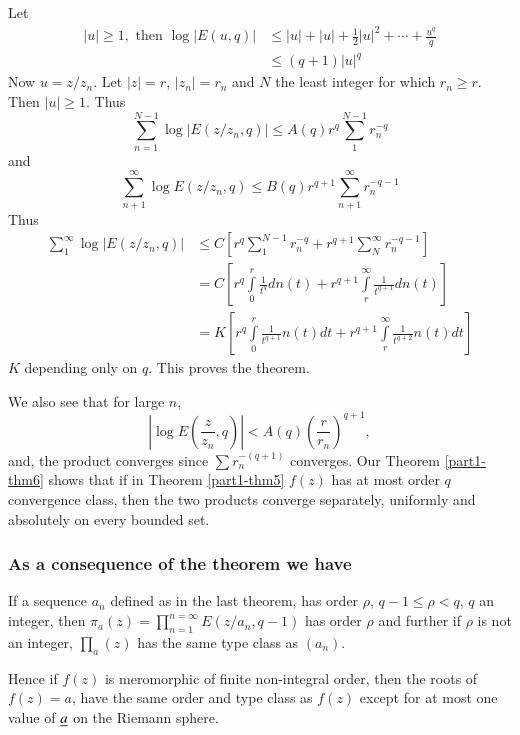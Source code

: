 Let
\begin{align*}
|u|\geq 1, \text{ \ then \ } \log |E(u,q)| &\leq
|u|+|u|+\frac{1}{2}|u|^{2}+\cdots+\frac{u^{q}}{q}\\
&\leq (q+1)|u|^{q} 
\end{align*}
Now $u=z/z_{n}$. Let $|z|=r$, $|z_{n}|=r_{n}$ and $N$ the least
integer for which $r_{n}\geq r$. Then $|u|\geq 1$. Thus
$$
\sum^{N-1}_{n=1}\log |E(z/z_{n},q)|\leq
A(q)r^{q}\sum^{N-1}_{1}r^{-q}_{n}
$$
and
$$
\sum^{\infty}_{n+1}\log E(z/z_{n},q)\leq
B(q)r^{q+1}\sum^{\infty}_{n+1}r^{-q-1}_{n} 
$$
Thus 
\begin{align*}
\sum^{\infty}_{1}\log |E(z/z_{n},q)| &\leq
C\left[r^{q}\sum^{N-1}_{1}r^{-q}_{n}+r^{q+1}\sum^{\infty}_{N}r^{-q-1}_{n}\right]\\
&=
C\left[r^{q}\int\limits^{r}_{0}\frac{1}{t^{q}}dn(t)+r^{q+1}\int\limits^{\infty}_{r}\frac{1}{t^{q+1}}dn(t)\right]
\\
&= K\left[r^{q}\int\limits^{r}_{0}\frac{1}{t^{q+1}}n(t)dt+r^{q+1}\int\limits^{\infty}_{r}\frac{1}{t^{q+2}}n(t)dt\right]
\end{align*}\pageoriginale
$K$ depending only on $q$. This proves the theorem.

We also see that for large $n$,
$$
\left|\log
E\left(\frac{z}{z_{n}},q\right)\right|<A(q)\left(\frac{r}{r_{n}}\right)^{q+1},
$$
and, the product converges since $\sum r^{-(q+1)}_{n}$ converges. Our
Theorem \ref{part1-thm6} shows that if in Theorem \ref{part1-thm5}
$f(z)$ has at most order $q$ convergence class, then the two products
converge separately, uniformly and absolutely on every bounded set.

\subsubsection{As a consequence of the theorem we
  have}\label{part1-subsubsec1.9.2} 

\begin{thm}\label{part1-thm7}
If a sequence $a_{n}$ defined as in the last theorem, has order
$\rho$, $q-1\leq \rho<q$, $q$ an integer, then
$\pi_{a}(z)=\prod\limits^{n=\infty}_{n=1}E(z/a_{n},q-1)$ has order
$\rho$ and further if $\rho$ is not an integer, $\prod\limits_{a}(z)$
has the same type class as $(a_{n})$.
\end{thm}

Hence if $f(z)$ is meromorphic of finite non-integral order, then the
roots of $f(z)=a$, have the same order and type class as $f(z)$ except
for at most one value of $\underline{a}$ on the Riemann sphere.

